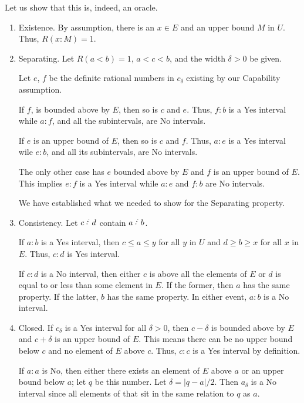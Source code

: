 \documentclass[12pt]{article}
\begin{document}
Let us show that this is, indeed, an oracle. 

\begin{enumerate}
    \item Existence. By assumption, there is an $x \in E$ and an upper bound $M$ in $U$. Thus, $R(x:M) = 1$. 
    \item Separating. Let $R(a\lt b)=1$, $a < c< b$, and the width $\delta > 0$ be given. 

    Let $e$, $f$ be the definite rational numbers in $c_\delta$ existing by our Capability assumption. 

    If $f$, is bounded above by $E$, then so is $c$ and $e$. Thus, $f:b$ is a Yes interval while $a:f$, and all the subintervals, are No intervals. 

    If $e$ is an upper bound of $E$, then so is $c$ and $f$. Thus, $a:e$ is a Yes interval wile $e:b$, and all its subintervals, are No intervals. 

    The only other case has $e$ bounded above by $E$ and $f$ is an upper bound of $E$. This implies $e:f$ is a Yes interval while $a:e$ and $f:b$ are No intervals. 

    We have established what we needed to show for the Separating property. 
    
    \item Consistency. Let $c\lte d$ contain $a\lte b$. 
    
    If $a : b$ is a Yes interval, then $c \leq a \leq y$ for all $y$ in $U$ and $d \geq b \geq x$ for all $x$ in $E$. Thus, $c : d$ is Yes interval.

    If $c:d$ is a No interval, then either $c$ is above all the elements of $E$ or $d$ is equal to or less than some element in $E$. If the former, then $a$ has the same property. If the latter, $b$ has the same property. In either event, $a:b$ is a No interval. 

    
    \item Closed. If $c_\delta$ is a Yes interval for all $\delta > 0$, then $c-\delta$ is bounded above by $E$ and $c+\delta$ is an upper bound of $E$. This means there can be no upper bound below $c$ and no element of $E$ above $c$.  Thus, $c:c$ is a Yes interval by definition. 

    If $a:a$ is No, then either there exists an element of $E$ above $a$ or an upper bound below $a$; let $q$ be this number. Let $\delta = |q-a|/2$. Then $a_\delta$ is a No interval since all elements of that sit in the same relation to $q$ as $a$.
    \end{enumerate}
\end{document}
